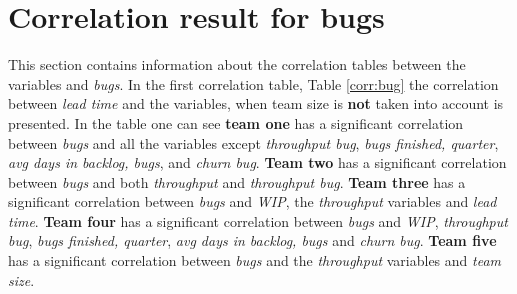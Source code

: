 \documentclass[UKenglish]{ifimaster}  %
\begin{document}
\section{Correlation result for bugs}
\label{sec:corr:bug}
This section contains information about the correlation tables between the variables and \textit{bugs}. In the first correlation 
table, Table \ref{corr:bug} the correlation  between \textit{lead time} and the variables, when team size is \textbf{not} taken into account is presented. In the table one can see \textbf{team one} has a significant correlation between \textit{bugs} and all the variables except \textit{throughput bug}, \textit{bugs finished, quarter}, \textit{avg days in backlog, bugs}, and \textit{churn bug}. \textbf{Team two} has a significant correlation between \textit{bugs} and both \textit{throughput} and \textit{throughput bug}. \textbf{Team three} has a significant correlation between \textit{bugs} and \textit{WIP}, the \textit{throughput} variables and \textit{lead time}. \textbf{Team four} has a significant correlation between \textit{bugs} and \textit{WIP}, \textit{throughput bug}, \textit{bugs finished, quarter}, \textit{avg days in backlog, bugs} and \textit{churn bug}. \textbf{Team five} has a significant correlation between \textit{bugs} and the \textit{throughput} variables and \textit{team size}. 
\end{document}
